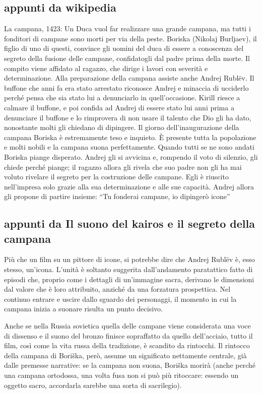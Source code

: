 \subsection*{appunti da wikipedia}

La campana, 1423: Un Duca vuol far realizzare una grande campana, ma tutti i fonditori di campane sono morti per via della peste. Boriska (Nikolaj Burljaev), il figlio di uno di questi, convince gli uomini del duca di essere a conoscenza del segreto della fusione delle campane, confidatogli dal padre prima della morte. Il compito viene affidato al ragazzo, che dirige i lavori con severità e determinazione. Alla preparazione della campana assiste anche Andrej Rublëv. Il buffone che anni fa era stato arrestato riconosce Andrej e minaccia di ucciderlo perché pensa che sia stato lui a denunciarlo in quell'occasione. Kirill riesce a calmare il buffone, e poi confida ad Andrej di essere stato lui anni prima a denunciare il buffone e lo rimprovera di non usare il talento che Dio gli ha dato, nonostante molti gli chiedano di dipingere. Il giorno dell'inaugurazione della campana Boriska è estremamente teso e inquieto. È presente tutta la popolazione e molti nobili e la campana suona perfettamente. Quando tutti se ne sono andati Boriska piange disperato. Andrej gli si avvicina e, rompendo il voto di silenzio, gli chiede perché piange; il ragazzo allora gli rivela che suo padre non gli ha mai voluto rivelare il segreto per la costruzione delle campane. Egli è riuscito nell'impresa solo grazie alla sua determinazione e alle sue capacità. Andrej allora gli propone di partire insieme: “Tu fonderai campane, io dipingerò icone”


\subsection*{appunti da Il suono del kairos e il segreto della campana}
Più che un film su un pittore di icone, si potrebbe dire che Andrej Rublëv è, esso stesso, un'icona. L'unità è soltanto suggerita dall'andamento paratattico fatto di episodi che, proprio come i dettagli di un'immagine sacra, derivano le dimensioni dal valore che è loro attribuito, anziché da una forzatura prospettica. Nel continuo entrare e uscire dallo sguardo dei personaggi, il momento in cui la campana inizia a suonare risulta  un punto decisivo.

Anche se nella Russia sovietica quella delle campane viene considerata una voce di dissenso e il suono del bronzo finisce sopraffatto da quello dell'acciaio, tutto il film, così come la vita russa della tradizione, è scandito da rintocchi. Il rintocco della campana di Boriška, però, assume un significato nettamente centrale, già dalle premesse narrative: se la campana non suona, Boriška morirà (anche perché una campana ortodossa, una volta fusa non si può più ritoccare: essendo un oggetto sacro, accordarla sarebbe una sorta di sacrilegio).

